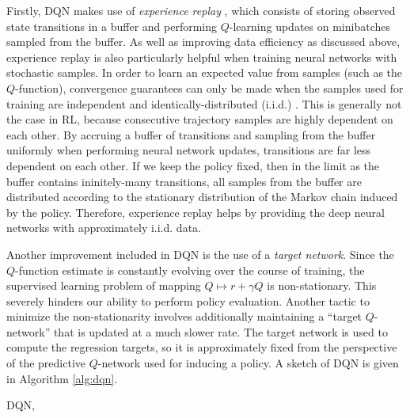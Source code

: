 Firstly, DQN makes use of \emph{experience replay}
\citep{lin1992self}, which consists of storing observed state
transitions in a buffer and performing $Q$-learning updates on
minibatches sampled from the buffer. As well as improving data
efficiency as discussed above, experience replay is also particularly
helpful when training neural networks with stochastic samples. In
order to learn an expected value from samples (such as the
$Q$-function), convergence guarantees can only be made when the
samples used for training are independent and identically-distributed (i.i.d.)
\citep{friedman2017elements}. This is generally not the case in RL,
because consecutive trajectory samples are highly dependent on each
other. By accruing a buffer of transitions and sampling from the
buffer uniformly when performing neural network updates, transitions
are far less dependent on each other. If we keep the policy fixed,
then in the limit as the buffer contains ininitely-many transitions,
all samples from the buffer are distributed according to the
stationary distribution of the Markov chain induced by the
policy. Therefore, experience replay helps by providing the deep
neural networks with approximately i.i.d. data.

Another improvement included in DQN is the use of a \emph{target
  network}. Since the $Q$-function estimate is constantly evolving over the
course of training, the supervised learning problem of mapping
$Q\mapsto r + \gamma Q$ is non-stationary. This severely hinders our
ability to perform policy evaluation. Another tactic to minimize the
non-stationarity involves additionally maintaining a ``target
$Q$-network'' that is updated at a much slower rate. The target
network is used to compute the regression targets, so it is
approximately fixed from the perspective of the predictive
$Q$-network used for inducing a policy. A sketch of DQN is given in
Algorithm \ref{alg:dqn}.

\begin{algorithm}[h]
  \caption[DQN]{DQN, \citet{mnih2015human}}\label{alg:dqn}
  \begin{algorithmic}
    \EndIf
    \EndFor
  \end{algorithmic}
\end{algorithm}


